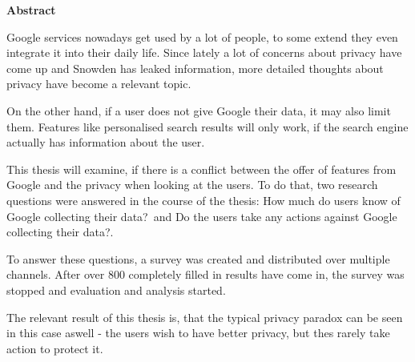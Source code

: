 \vspace{2em}
\begin{center}
	\begin{large}
		\textbf{Abstract}
	\end{large}
\end{center}
\vspace{0.75em}
Google services nowadays get used by a lot of people, to some extend they even integrate it into their daily life.  Since lately a lot of concerns about privacy have come up and Snowden has leaked information, more detailed thoughts about privacy have become a relevant topic.

On the other hand, if a user does not give Google their data, it may also limit them. Features like personalised search results will only work, if the search engine actually has information about the user.

This thesis will examine, if there is a conflict between the offer of features from Google and the privacy when looking at the users. To do that, two research questions were answered in the course of the thesis: \glqq How much do users know of Google collecting their data?\grqq\ and \glqq Do the users take any actions against Google collecting their data?\grqq .

To answer these questions, a survey was created and distributed over multiple channels. After over 800 completely filled in results have come in, the survey was stopped and evaluation and analysis started.

The relevant result of this thesis is, that the typical privacy paradox can be seen in this case aswell - the users wish to have better privacy, but thes rarely take action to protect it.